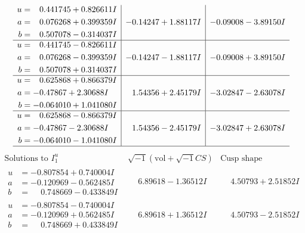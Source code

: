 \documentclass[1p]{elsarticle_modified}
\theoremstyle{definition}
\newcommand{\I}{\sqrt{-1}}
\begin{document}
$$\begin{array}{c|c|c}
\begin{aligned}
u &= \phantom{-}0.441745 + 0.826611 I \\
a &= \phantom{-}0.076268 + 0.399359 I \\
b &= \phantom{-}0.507078 - 0.314037 I\end{aligned}
 & -0.14247 + 1.88117 I & -0.09008 - 3.89150 I \\ \hline\begin{aligned}
u &= \phantom{-}0.441745 - 0.826611 I \\
a &= \phantom{-}0.076268 - 0.399359 I \\
b &= \phantom{-}0.507078 + 0.314037 I\end{aligned}
 & -0.14247 - 1.88117 I & -0.09008 + 3.89150 I \\ \hline\begin{aligned}
u &= \phantom{-}0.625868 + 0.866379 I \\
a &= -0.47867 + 2.30688 I \\
b &= -0.064010 + 1.041080 I\end{aligned}
 & \phantom{-}1.54356 + 2.45179 I & -3.02847 - 2.63078 I \\ \hline\begin{aligned}
u &= \phantom{-}0.625868 - 0.866379 I \\
a &= -0.47867 - 2.30688 I \\
b &= -0.064010 - 1.041080 I\end{aligned}
 & \phantom{-}1.54356 - 2.45179 I & -3.02847 + 2.63078 I\\
 \hline 
 \end{array}$$\newpage$$\begin{array}{c|c|c}  
\text{Solutions to }I^u_{1}& \I (\text{vol} + \sqrt{-1}CS) & \text{Cusp shape}\\
 \hline 
\begin{aligned}
u &= -0.807854 + 0.740004 I \\
a &= -0.120969 - 0.562485 I \\
b &= \phantom{-}0.748669 - 0.433849 I\end{aligned}
 & \phantom{-}6.89618 - 1.36512 I & \phantom{-}4.50793 + 2.51852 I \\ \hline\begin{aligned}
u &= -0.807854 - 0.740004 I \\
a &= -0.120969 + 0.562485 I \\
b &= \phantom{-}0.748669 + 0.433849 I\end{aligned}
 & \phantom{-}6.89618 + 1.36512 I & \phantom{-}4.50793 - 2.51852 I \\ \hline\begin{aligned}

\end{aligned}
\end{array}$$
\end{document}
